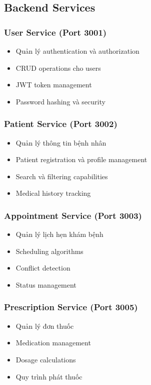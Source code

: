 \documentclass[12pt,a4paper]{report}
\begin{document}
\subsection{Backend Services}
\subsubsection{User Service (Port 3001)}
\begin{itemize}
    \item Quản lý authentication và authorization
    \item CRUD operations cho users
    \item JWT token management
    \item Password hashing và security
\end{itemize}

\subsubsection{Patient Service (Port 3002)}
\begin{itemize}
    \item Quản lý thông tin bệnh nhân
    \item Patient registration và profile management
    \item Search và filtering capabilities
    \item Medical history tracking
\end{itemize}

\subsubsection{Appointment Service (Port 3003)}
\begin{itemize}
    \item Quản lý lịch hẹn khám bệnh
    \item Scheduling algorithms
    \item Conflict detection
    \item Status management
\end{itemize}

\subsubsection{Prescription Service (Port 3005)}
\begin{itemize}
    \item Quản lý đơn thuốc
    \item Medication management
    \item Dosage calculations
    \item Quy trình phát thuốc
\end{itemize}
\end{document}

